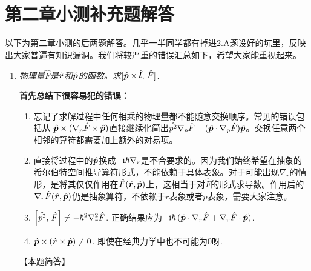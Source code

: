 \section{第二章小测补充题解答}
以下为第二章小测的后两题解答。几乎一半同学都有掉进2.A题设好的坑里，反映出大家普遍有知识漏洞。我们将较严重的错误汇总如下，希望大家能重视起来。

\begin{enumerate}[label=2.\Alph*, leftmargin=-0.5mm]
\item
\emph{物理量$\hat{F}$是$\hat{\boldsymbol{r}}$和$\hat{\boldsymbol{p}}$的函数。求$[\hat{\boldsymbol{p}}\times\hat{\boldsymbol{l}},\,\hat{F}]$.}

{\color{red}\textbf{首先总结下很容易犯的错误：}}
\begin{enumerate}
    \item 忘记了求解过程中任何相乘的物理量都不能随意交换顺序。常见的错误包括从
    $\hat{\boldsymbol{p}}\times(\nabla_p\hat{F}\times\hat{\boldsymbol{p}})$直接继续化简出$\hat{p^2}\nabla_p\hat{F}-(\hat{\boldsymbol{p}}\cdot\nabla_p\hat{F})\hat{\boldsymbol{p}}$。交换任意两个相邻的算符都需要加上额外的对易项。
    
    \item 直接将过程中的$\hat{\boldsymbol{p}}$换成$-\mathrm{i}\hbar\nabla_r$是不合要求的。因为我们始终希望在抽象的希尔伯特空间推导算符形式，不能依赖于具体表象。对于可能出现$\nabla_r$的情形，是将其仅仅作用在$\hat{F}(\hat{\boldsymbol{r}},\hat{\boldsymbol{p}})$上，这相当于对$\hat{F}$的形式求导数。作用后的$\nabla_r\hat{F}(\hat{\boldsymbol{r}},\hat{\boldsymbol{p}})$仍是抽象算符，不依赖于$r$表象或者$p$表象，需要大家注意。
    
    \item $\qty[\hat{p^2},\,\hat{F}]\neq-\hbar^2\nabla^2_r \hat{F}$. 正确结果应为$-\mathrm{i}\hbar\,(\hat{\boldsymbol{p}}\cdot \nabla_r\hat{F} + \nabla_r\hat{F}\cdot \hat{\boldsymbol{p}})$.
    
    \item $\hat{\boldsymbol{p}}\times(\hat{\boldsymbol{r}}\times\hat{\boldsymbol{p}})\neq 0$. 即使在经典力学中也不可能为0呀.
\end{enumerate}
【本题简答】


\end{enumerate}
